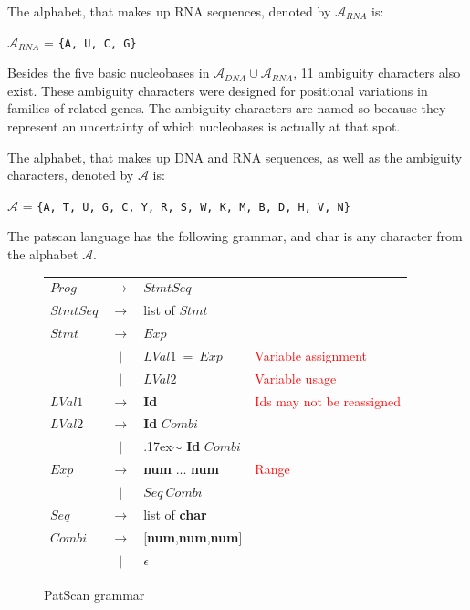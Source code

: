 \documentclass[12pt]{article}
\theoremstyle{definition}
\begin{document}
\begin{definition}
The alphabet, that makes up RNA sequences, denoted by $\mathcal{A}_{RNA}$ is:
\begin{center}
$\mathcal{A}_{RNA}$ = \texttt{\{A, U, C, G\}}
\end{center}
\end{definition}

Besides the five basic nucleobases in $\mathcal{A}_{DNA} \cup \mathcal{A}_{RNA}$, 11 ambiguity characters also exist.\cite{DNA-sciencedaily} These ambiguity characters were designed for positional variations in families of related genes. The ambiguity characters are named so because they represent  an uncertainty of which nucleobases is actually at that spot.

\begin{definition}
The alphabet, that makes up DNA and RNA sequences, as well as the ambiguity characters, denoted by $\mathcal{A}$ is:
\begin{center}
$\mathcal{A}$ = \texttt{\{A, T, U, G, C, Y, R, S, W, K, M, B, D, H, V, N\}}
\end{center}
\end{definition}

The patscan language has the following grammar, and char is any character from the alphabet $\mathcal{A}$.

\begin{figure}[H]
\begin{center}
\begin{tabular}{|lcll|}
	\hline
	$Prog$ & $\rightarrow$ & $StmtSeq$ & \\
	$StmtSeq$ & $\rightarrow$ & list of $Stmt$ & \\
	$Stmt$ & $\rightarrow$ & $Exp$ & \\
	\enspace & $|$ & $LVal1\ =\ Exp$ &  \textcolor{red}{Variable assignment} \\
	\enspace & $|$ & $LVal2$ & \textcolor{red}{Variable usage} \\
	$LVal1$ & $\rightarrow$ & \textbf{Id} & \textcolor{red}{Ids may not be reassigned}\\
	$LVal2$ & $\rightarrow$ & \textbf{Id} $Combi$ & \\
	\enspace & $|$ & {\raise.17ex\hbox{$\scriptstyle\mathtt{\sim}$}} \textbf{Id} $Combi$ & \\
	$Exp$ & $\rightarrow$ & \textbf{num} ... \textbf{num} & \textcolor{red}{Range} \\
	\enspace & $|$ & $Seq\ Combi$ & \\
	$Seq$ & $\rightarrow$ & list of \textbf{char} & \\
	$Combi$ & $\rightarrow$ & [\textbf{num},\textbf{num},\textbf{num}] & \\
	\enspace & $|$ & $\epsilon$ & \\
	\hline
\end{tabular}
\end{center}
\caption{PatScan grammar}
\end{figure}
\end{document}
